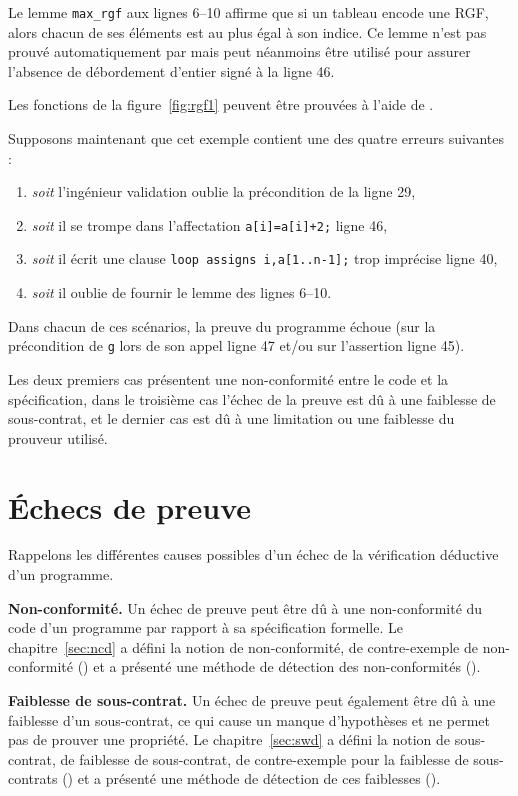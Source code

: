 Le lemme \lstinline'max_rgf' aux lignes 6--10 affirme que si un tableau
encode une RGF, alors chacun de ses éléments est au plus égal à son indice.
Ce lemme n'est pas prouvé automatiquement par \Wp mais peut néanmoins être
utilisé pour assurer l'absence de débordement d'entier signé à la ligne 46.

Les fonctions de la figure~\ref{fig:rgf1} peuvent être prouvées à l'aide de \Wp.

Supposons maintenant que cet exemple contient une des quatre erreurs suivantes :
\begin{enumerate}
\item \emph{soit} l'ingénieur validation oublie la précondition de la ligne 29,
\item \emph{soit} il se trompe dans l'affectation
  \lstinline[style=c]'a[i]=a[i]+2;' ligne 46,
\item \emph{soit} il écrit une clause
  \lstinline[style=c]'loop assigns i,a[1..n-1];' trop imprécise ligne 40,
\item \emph{soit} il oublie de fournir le lemme des lignes 6--10.
\end{enumerate}
Dans chacun de ces scénarios, la preuve du programme échoue (sur la précondition
de \lstinline{g} lors de son appel ligne 47 et/ou sur l'assertion ligne 45).

Les deux premiers cas présentent une non-conformité entre le code et
la spécification, dans le troisième cas l'échec de la preuve est dû à une
faiblesse de sous-contrat, et le dernier cas est dû à une limitation ou une
faiblesse du prouveur utilisé.


\section{Échecs de preuve}
\label{sec:method-proof-failures}


Rappelons les différentes causes possibles d'un échec de la vérification
déductive d'un programme.

\textbf{Non-conformité.}
Un échec de preuve peut être dû à une non-conformité du code d'un programme par
rapport à sa spécification formelle.
Le chapitre~\ref{sec:ncd} a défini la notion de non-conformité, de
contre-exemple de non-conformité (\NCCE) et a présenté une méthode de détection
des non-conformités (\NCD).

\textbf{Faiblesse de sous-contrat.}
Un échec de preuve peut également être dû à une faiblesse d'un
sous-contrat, ce qui cause un manque d'hypothèses et ne permet pas de prouver
une propriété.
Le chapitre~\ref{sec:swd} a défini la notion de sous-contrat, de faiblesse de
sous-contrat, de contre-exemple pour la faiblesse de sous-contrats (\SWCE) et
a présenté une méthode de détection de ces faiblesses (\SWD).

